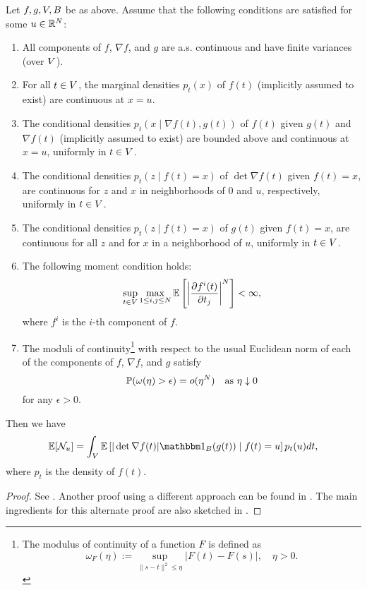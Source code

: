 \begin{theorem}
	\label{thm: general kac-rice}
	Let \(f,g,V, B\) be as above. Assume that the following conditions are
	satisfied for some \(u\in\mathbb{R}^N\):	
	\begin{enumerate}[label={(\alph*)}]
		\item All components of \(f\), \(\nabla f\), and \(g\) are a.s. continuous
		and have finite variances (over \(V\)).
		\item For all \(t\in V\), the marginal densities \(p_t(x)\) of \(f(t)\)
		(implicitly assumed to exist) are continuous at \(x=u\).
		\item The conditional densities \(p_t(x\mid\nabla f(t), g(t))\) of \(f(t)\)
		given \(g(t)\) and \(\nabla f(t)\) (implicitly assumed to exist) are
		bounded above and continuous at \(x=u\), uniformly in \(t\in V\).
		\item The conditional densities \(p_t(z\mid f(t) = x)\) of \(\det \nabla f(t)\)
		given \(f(t)=x\), are continuous for \(z\) and \(x\) in neighborhoods of \(0\)
		and \(u\), respectively, uniformly in \(t\in V\).
		\item The conditional densities \(p_t(z\mid f(t) = x)\) of \(g(t)\)
		given \(f(t) = x\), are continuous for all \(z\) and for \(x\) in a
		neighborhood of \(u\), uniformly in \(t\in V\).
		\item The following moment condition holds:
		\[
			\sup_{t\in V}\max_{1\le i,j\le N} \mathbb{E}\left[
				\left|\frac{\partial f^i(t)}{\partial t_j}\right|^N
			\right] < \infty,
		\]
		where \(f^i\) is the \(i\)-th component of \(f\).
		\item The moduli of continuity\footnote{
			The modulus of continuity of a function \(F\) is defined as
			\[
				\omega_F(\eta):= \sup_{\|s-t\|^2\le \eta}|F(t)-F(s)|, \quad \eta>0.
			\]
		} with respect to the
		usual Euclidean norm of each of the components of \(f\), \(\nabla f\), and
		\(g\) satisfy
		\[
			\mathbb{P}(\omega(\eta) > \epsilon) = o(\eta^N) \quad\text{as }\eta\downarrow 0
		\]
		for any \(\epsilon>0\).
	\end{enumerate}
	Then we have
	\begin{equation}
		\E[\level] = \int_\Vol \E\left[
			|\det \nabla f(t)| \ind_B(g(t)) \mid f(t) = u
		\right] p_t(u)dt,
	\end{equation}
	where \(p_t\) is the density of \(f(t)\).	
\end{theorem}
\begin{proof}
	See \textcite[Section~11.2]{adlerRandomFieldsGeometry2007}. Another proof
	using a different approach can be found in
	\textcite[Theorem~6.4]{azaisLevelSetsExtrema2009}. The main ingredients for
	this alternate proof are also sketched in
	\textcite[Section~11.4]{adlerRandomFieldsGeometry2007}.
\end{proof}


